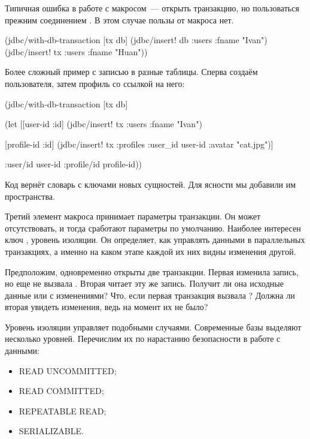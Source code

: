 Типичная ошибка в работе с макросом~--- открыть транзакцию, но пользоваться прежним соединением . В этом случае пользы от макроса нет.

\begin{english}
  \begin{clojure/lines}
(jdbc/with-db-transaction [tx db]
  (jdbc/insert! db :users {:fname "Ivan"})
  (jdbc/insert! tx :users {:fname "Huan"}))
  \end{clojure/lines}
\end{english}

Более сложный пример с записью в разные таблицы. Сперва создаём пользователя, затем профиль со ссылкой на него:

\begin{english}
  \begin{clojure}
(jdbc/with-db-transaction [tx db]

  (let [[{user-id :id}]
        (jdbc/insert! tx :users {:fname "Ivan"})

        [{profile-id :id}]
        (jdbc/insert! tx :profiles
                      {:user_id user-id
                       :avatar "cat.jpg"})]

    {:user/id user-id
     :profile/id profile-id}))
  \end{clojure}
\end{english}

Код вернёт словарь с ключами новых сущностей. Для ясности мы добавили им пространства.


Третий элемент макроса принимает параметры транзакции. Он может отсутствовать, и тогда сработают параметры по умолчанию. Наиболее интересен ключ , уровень изоляции. Он определяет, как управлять данными в параллельных транзакциях, а именно на каком этапе каждой их них видны изменения другой.

Предположим, одновременно открыты две транзакции. Первая изменила запись, но еще не вызвала . Вторая читает эту же запись. Получит ли она исходные данные или с изменениями? Что, если первая транзакция вызвала ? Должна ли вторая увидеть изменения, ведь на момент  их не было?

Уровень изоляции управляет подобными случаями. Современные базы выделяют несколько уровней. Перечислим их по нарастанию безопасности в работе с данными:

\begin{itemize}

\item
  READ UNCOMMITTED;

\item
  READ COMMITTED;

\item
  REPEATABLE READ;

\item
  SERIALIZABLE.

\end{itemize}

